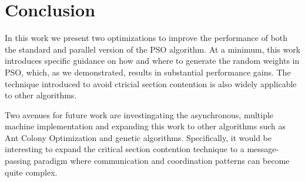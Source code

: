 \section{Conclusion}
In this work we present two optimizations to improve the performance of both the
standard and parallel version of the PSO algorithm. At a minimum, this work
introduces specific guidance on how and where to generate the random weights in
PSO, which, as we demonstrated, results in substantial performance gains. The
technique introduced to avoid ctricial section contention is also widely
applicable to other algorithms.

Two avenues for future work are investingating the asynchronous, multiple
machine implementation and expanding this work to other algorithms such as Ant
Colony Optimization and genetic algorithms. Specifically, it would be
interesting to expand the critical section contention technique to a
message-passing paradigm where communication and coordination patterns can
become quite complex.


